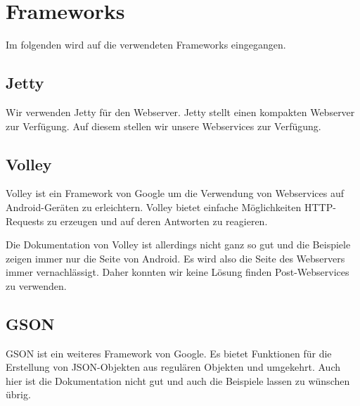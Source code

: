 \chapter{Frameworks}
Im folgenden wird auf die verwendeten Frameworks eingegangen.

\section{Jetty}
Wir verwenden Jetty für den Webserver. Jetty stellt einen kompakten Webserver zur Verfügung. Auf diesem stellen wir unsere Webservices zur Verfügung.

\section{Volley}
Volley ist ein Framework von Google um die Verwendung von Webservices auf Android-Geräten zu erleichtern. Volley bietet einfache Möglichkeiten HTTP-Requests zu erzeugen und auf deren Antworten zu reagieren.

Die Dokumentation von Volley ist allerdings nicht ganz so gut und die Beispiele zeigen immer nur die Seite von Android. Es wird also die Seite des Webservers immer vernachlässigt. Daher konnten wir keine Lösung finden Post-Webservices zu verwenden.

\section{GSON}
GSON ist ein weiteres Framework von Google. Es bietet Funktionen für die Erstellung von JSON-Objekten aus regulären Objekten und umgekehrt. Auch hier ist die Dokumentation nicht gut und auch die Beispiele lassen zu wünschen übrig.